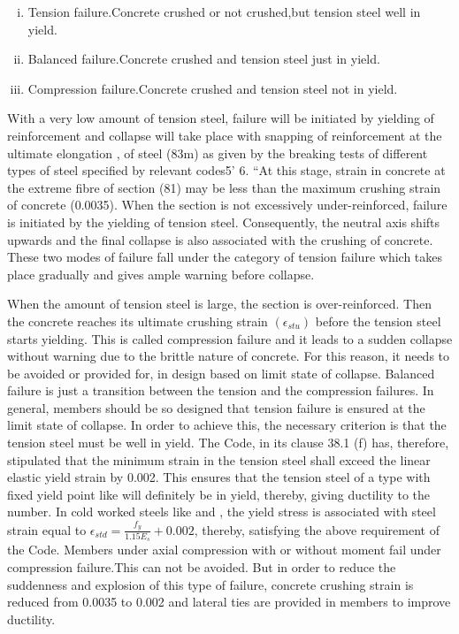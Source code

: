 \begin{enumerate}[(i)]
\item Tension failure.Concrete crushed or not crushed,but tension steel well in yield.
\item Balanced failure.Concrete crushed and tension steel just in yield.
\item Compression failure.Concrete crushed and tension steel not in yield.
\end{enumerate}

With a very low amount of tension steel, failure will be initiated by
yielding of reinforcement and collapse will take place with snapping of
reinforcement at the ultimate elongation , of steel (83m) as given by 
the breaking tests of different types of steel speciﬁed by relevant
codes5’ 6. “At this stage, strain in concrete at the extreme ﬁbre of 
section (81) may be less than the maximum crushing strain of concrete
(0.0035). When the section is not excessively under-reinforced, failure
is initiated by the yielding of tension steel. Consequently, the neutral
axis shifts upwards and the ﬁnal collapse is also associated with the
crushing of concrete. These two modes of failure fall under the category
of tension failure which takes place gradually and gives ample warning
before collapse.

When the amount of tension steel is large, the section is over-reinforced.
Then the concrete reaches its ultimate crushing strain $(\epsilon_{stu})$
before the tension steel starts yielding. This is called compression
failure and it leads to a sudden collapse without warning due to the
brittle nature of concrete. For this reason, it needs to be avoided or
provided for, in design based on limit state of collapse. Balanced
failure is just a transition between the tension and the compression
failures. In general, members should be so designed that tension failure
is ensured at the limit state of collapse. In order to achieve this, the
necessary criterion is that the tension steel must be well in yield. The
Code, in its clause 38.1 (f) has, therefore, stipulated that the minimum
strain in the tension steel shall exceed the linear elastic yield strain
by 0.002. This ensures that the tension steel of a type with ﬁxed yield
point like {\fetwofivezero} will deﬁnitely be in yield, thereby, giving ductility
to the number. In cold worked steels like {\fefouronefive} and
{\fefivezerozero}, the yield stress is associated with steel strain equal to
$\epsilon_{std}=\frac{f_y}{1.15 E_s}+0.002$, thereby, satisfying the
above requirement of the Code. Members under axial compression with or
without moment fail under compression failure.This can not be avoided.
But in order to reduce the suddenness and explosion of this type of
failure, concrete crushing strain is reduced from 0.0035 to 0.002 and
lateral ties are provided in members to improve ductility.

